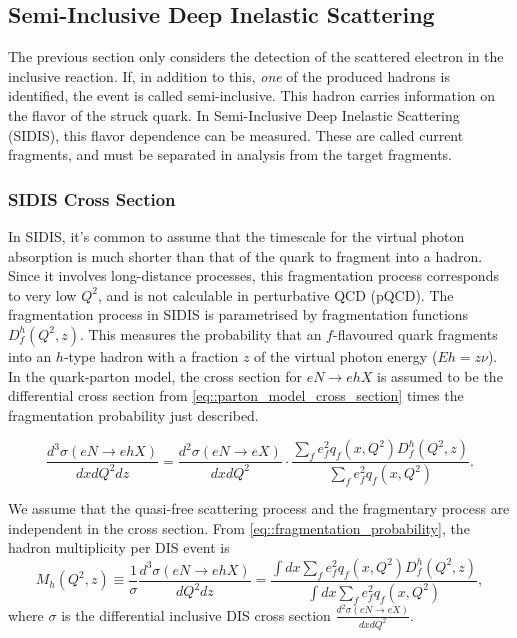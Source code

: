 \subsection{Semi-Inclusive Deep Inelastic Scattering}
    The previous section only considers the detection of the scattered electron in the inclusive reaction.
    If, in addition to this, \textit{one} of the produced hadrons is identified, the event is called semi-inclusive.
    This hadron carries information on the flavor of the struck quark.
    In Semi-Inclusive Deep Inelastic Scattering (SIDIS), this flavor dependence can be measured.
    These are called current fragments, and must be separated in analysis from the target fragments.

    \subsubsection{SIDIS Cross Section}
        In SIDIS, it's common to assume that the timescale for the virtual photon absorption is much shorter than that of the quark to fragment into a hadron.
        Since it involves long-distance processes, this fragmentation process corresponds to very low $Q^2$, and is not calculable in perturbative QCD (pQCD).
        The fragmentation process in SIDIS is parametrised by fragmentation functions $D_f^h(Q^2, z)$.
        This measures the probability that an $f$-flavoured quark fragments into an $h$-type hadron with a fraction $z$ of the virtual photon energy ($Eh=z\nu$).
        In the quark-parton model, the cross section for $eN \rightarrow ehX$ is assumed to be the differential cross section from \eqref{eq::parton_model_cross_section} times the fragmentation probability just described.

        \begin{equation}
            \label{eq::fragmentation_probability}
            \frac{d^3\sigma(eN \rightarrow ehX)}{dxdQ^2dz} =
                    \frac{d^2\sigma(eN \rightarrow eX)}{dxdQ^2} \cdot
                    \frac{\sum_fe^2_f q_f(x,Q^2) D^h_f(Q^2,z)}{\sum_f e^2_f q_f(x,Q^2)}.
        \end{equation}

        We assume that the quasi-free scattering process and the fragmentary process are independent in the cross section.
        From \eqref{eq::fragmentation_probability}, the hadron multiplicity per DIS event is
        \begin{equation*}
            M_h(Q^2,z)
                    \equiv \frac{1}{\sigma} \frac{d^3\sigma(eN \rightarrow ehX)}{dQ^2dz}
                    = \frac{\int dx \sum_f e^2_f q_f(x,Q^2) D^h_f(Q^2,z)}{\int dx \sum_f e^2_f q_f(x,Q^2)},
        \end{equation*}
        where $\sigma$ is the differential inclusive DIS cross section $\frac{d^2\sigma(eN \rightarrow eX)}{dxdQ^2}$.
